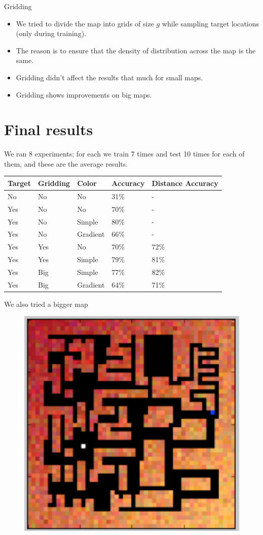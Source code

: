 \documentclass{beamer}
\begin{document}
\begin{frame}{Gridding}
\begin{itemize}
    \item We tried to divide the map into grids of size $g$ while sampling target locations (only during training).
    \item The reason is to ensure that the density of distribution across the map is the same.
    \item Gridding didn't affect the results that much for small maps.
    \item Gridding shows improvements on big maps.
\end{itemize}
\end{frame}

\section{Final results}
\begin{frame}
We ran 8 experiments; for each we train 7 times and test 10 times for each of them, and these are the average results.
\begin{center}
    \begin{tabular}{| l | l | l | l | l |}
    \hline
    Target & Gridding & Color & Accuracy & Distance Accuracy \\ \hline
    No & No & No & 31\% & - \\ \hline
    Yes & No & No & 70\% & - \\ \hline
    Yes & No & Simple & 80\% & - \\ \hline
    Yes & No & Gradient & 66\% & - \\ \hline
    Yes & Yes & No & 70\% & 72\% \\ \hline
    Yes & Yes & Simple & 79\% & 81\% \\ \hline
    Yes & Big & Simple & 77\% & 82\% \\ \hline
    Yes & Big & Gradient & 64\% & 71\% \\ \hline
    \end{tabular}
\end{center}
\end{frame}

\begin{frame}
We also tried a bigger map
\begin{figure}
        \includegraphics[width=0.45\linewidth]{bigmap.png}
    \label{fig2}
\end{figure}
\end{frame}
\end{document}
